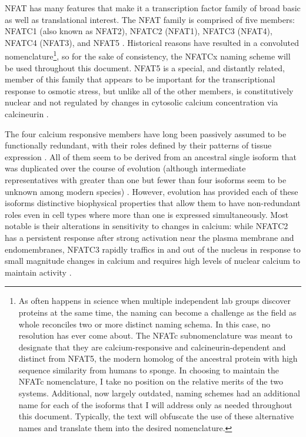 NFAT has many features that make it a transcription factor family of broad basic as well as translational interest. The NFAT family is comprised of five members: NFATC1 (also known as NFAT2), NFATC2 (NFAT1), NFATC3 (NFAT4), NFATC4 (NFAT3), and NFAT5 \citep{Rao1997}. Historical reasons have resulted in a convoluted nomenclature\footnote{As often happens in science when multiple independent lab groups discover proteins at the same time, the naming can become a challenge as the field as whole reconciles two or more distinct naming schema. In this case, no resolution has ever come about. The NFATc subnomenclature was meant to designate that they are calcium\hyp{}responsive and calcineurin\hyp{}dependent and distinct from NFAT5, the modern homolog of the ancestral protein with high sequence similarity from humans to sponge. In choosing to maintain the NFATc nomenclature, I take no position on the relative merits of the two systems. Additional, now largely outdated, naming schemes had an additional name for each of the isoforms that I will address only as needed throughout this document. Typically, the text will obfuscate the use of these alternative names and translate them into the desired nomenclature.}, so for the sake of consistency, the NFATCx naming scheme will be used throughout this document. NFAT5 is a special, and distantly related, member of this family that appears to be important for the transcriptional response to osmotic stress, but unlike all of the other members, is constitutively nuclear and not regulated by changes in cytosolic calcium concentration via calcineurin \citep{Go2004, Kumar2020a}.

The four calcium responsive members have long been passively assumed to be functionally redundant, with their roles defined by their patterns of tissue expression \citep{Klein2006, Mancini2009, Macian2005, Chow1999}. All of them seem to be derived from an ancestral single isoform that was duplicated over the course of evolution (although intermediate representatives with greater than one but fewer than four isoforms seem to be unknown among modern species) \citep{Muller2010}. However, evolution has provided each of these isoforms distinctive biophysical properties that allow them to have non\hyp{}redundant roles even in cell types where more than one is expressed simultaneously. Most notable is their alterations in sensitivity to changes in calcium: while NFATC2 has a persistent response after strong activation near the plasma membrane and endomembranes, NFATC3 rapidly traffics in and out of the nucleus in response to small magnitude changes in calcium and requires high levels of nuclear calcium to maintain activity \citep{Ulrich2012, Yissachar2013, Kar2015, Kar2016}. 

